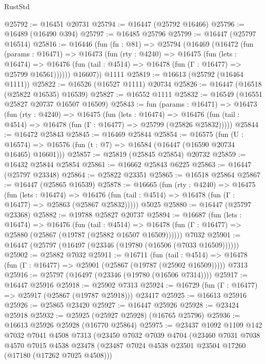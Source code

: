 \begin{lexlean}{RustStd}
\begin{coremodule}
@25792 := @16451 @20731
@25794 := @16447 (@25792 @16466)
@25796 := @16489 (@16490 @394)
@25797 := @16485 @25796
@25799 := @16447 (@25797 @16514)
@25816 := @16446
    (fun (fn : @81) =>
    @25794
      (@16469
        (@16472
          (fun (params : @16471) =>
          @16473
            (fun (rty : @4240) =>
            @16475
              (fun (lets : @16474) =>
              @16476 (fun (tail : @4514) => @16478 (fun (Γ : @16477) => @25799 @16561))))))
        @16607))
    @1111
@25819 := @16613 (@25792 (@16464 @1111))
@25822 := @16526 (@16527 @1111) @20734
@25826 := @16447 (@16518 (@25822 @16535) @16539)
@25827 := @16552 @1111
@25832 := @16549 (@16551 @25827 @20737 @16507 @16509)
@25843 := fun (params : @16471) =>
  @16473
    (fun (rty : @4240) =>
    @16475
      (fun (lets : @16474) =>
      @16476 (fun (tail : @4514) => @16478 (fun (Γ : @16477) => @25799 (@25826 @25832)))))
@25844 := @16472 @25843
@25845 := @16469 @25844
@25854 := @16575
    (fun (U : @16574) => @16576 (fun (t : @7) => @16584 (@16447 (@16590 @20734 @16465) @16601)))
@25857 := @25819 (@25845 @25854) @20732
@25859 := @16432 @25844 @25854
@25861 := @16662 @25843 @6225
@25863 := @16447 (@25797 @23348)
@25864 := @25822 @23351
@25865 := @16518 @25864
@25867 := @16447 (@25865 @16539)
@25878 := @16665
    (fun (rty : @4240) =>
    @16475
      (fun (lets : @16474) =>
      @16476 (fun (tail : @4514) => @16478 (fun (Γ : @16477) => @25863 (@25867 @25832)))))
    @5025
@25880 := @16447 (@25797 @23368)
@25882 := @19788 @25827 @20737
@25894 := @16687
    (fun (lets : @16474) =>
    @16476
      (fun (tail : @4514) =>
      @16478 (fun (Γ : @16477) => @25880 (@25867 (@19787 (@25882 @16507 @16509))))))
    @7032
@25901 := @16447 (@25797 (@16497 (@23346 (@19780 (@16506 (@7033 @16509))))))
@25902 := @25882 @7032
@25911 := @16711
    (fun (tail : @4514) => @16478 (fun (Γ : @16477) => @25901 (@25867 (@19787 (@25902 @16509)))))
    @7313
@25916 := @25797 (@16497 (@23346 (@19780 (@16506 @7314))))
@25917 := @16447 @25916
@25918 := @25902 @7313
@25924 := @16729 (fun (Γ : @16477) => @25917 (@25867 (@19787 @25918))) @23417
@25925 := @16613 @25916
@25926 := @25865 @23420
@25927 := @16447 @25926
@25928 := @23424 @25918
@25932 := @25925 (@25927 @25928) (@16765 @25796)
@25936 := @16613 @25926 @25928 (@16770 @25864)
@25975 := @23437
    @1092
    @1109
    @142
    @7032
    @7041
    @4508
    @7313
    (@23450
      @7032
      @7039
      @4704
      (@23460
        @7031
        @7038
        @4570
        @7015
        @4538
        @23478
        (@23487 @7024 @4538 @23501 @23504 @17260 (@17180 (@17262 @7025 @4508)))

\end{coremodule}
\end{lexlean}
